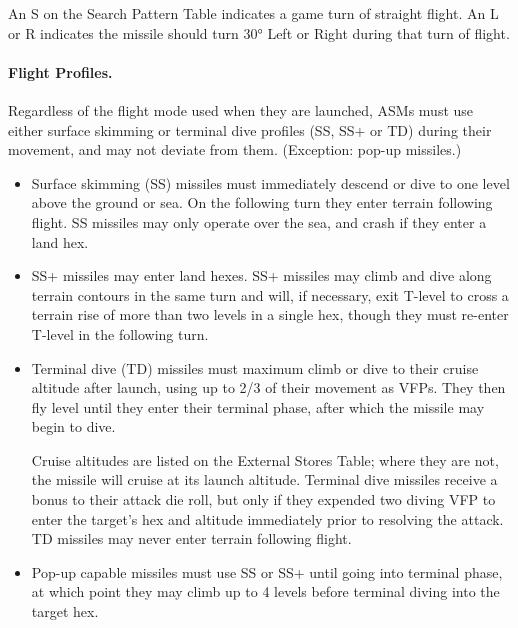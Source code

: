 \begin{advancedrules}
\begin{itemize}
    An S on the Search Pattern Table indicates a game turn of straight flight.  An L or R indicates the missile should turn 30° Left or Right during that turn of flight.

    

\end{itemize}

\paragraph{Flight Profiles.}  Regardless of the flight mode used when they are launched, ASMs must use either surface skimming or terminal dive profiles (SS, SS+ or TD) during their movement, and may not deviate from them.  (Exception: pop-up missiles.)


\begin{itemize}

    \item Surface skimming (SS) missiles must immediately descend or dive to one level above the ground or sea.  On the following turn they enter terrain following flight.  SS missiles may only operate over the sea, and crash if they enter a land hex.

    \item SS+ missiles may enter land hexes.  SS+ missiles may climb and dive along terrain contours in the same turn and will, if necessary, exit T-level to cross a terrain rise of more than two levels in a single hex, though they must re-enter T-level in the following turn.

    \item Terminal dive (TD) missiles must maximum climb or dive to their cruise altitude after launch, using up to 2/3 of their movement as VFPs.  They then fly level until they enter their terminal phase, after which the missile may begin to dive.   

    Cruise altitudes are listed on the External Stores Table; where they are not, the missile will cruise at its launch altitude. Terminal dive missiles receive a bonus to their attack die roll, but only if they expended two diving VFP to enter the target's hex and altitude immediately prior to resolving the attack.  TD missiles may never enter terrain following flight.

    \item Pop-up capable missiles must use SS or SS+ until going into terminal phase, at which point they may climb up to 4 levels before terminal diving into the target hex.


\end{itemize}
\end{advancedrules}

